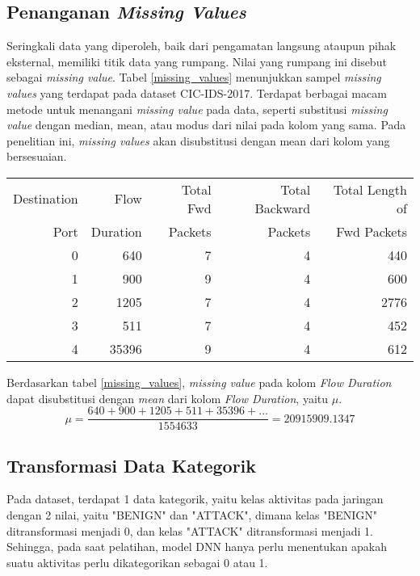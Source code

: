 \documentclass[a4paper,12pt]{report}
\begin{document}
\subsection{Penanganan \textit{Missing Values}}
Seringkali data yang diperoleh, baik dari pengamatan langsung ataupun pihak eksternal, memiliki titik data yang rumpang. Nilai yang rumpang ini disebut sebagai \textit{missing value}. Tabel \ref{missing_values} menunjukkan sampel \textit{missing values} yang terdapat pada dataset CIC-IDS-2017. Terdapat berbagai macam metode untuk menangani \textit{missing value} pada data, seperti substitusi \textit{missing value} dengan median, mean, atau modus dari nilai pada kolom yang sama. Pada penelitian ini, \textit{missing values} akan disubstitusi dengan mean dari kolom yang bersesuaian.
\begin{table}[h!]
	\centering
	\caption{Sampel data aktivitas jaringan}
	\label{sampel_data}
	\begin{longtable}{|r|r|r|r|r|}
		\hline
		Destination & Flow & Total Fwd & Total Backward & Total Length of  \\
		Port & Duration & Packets & Packets & Fwd Packets \\
		\hline
		0 & 640 & 7 & 4 & 440  \\
		\hline
		1 & 900 & 9 & 4 & 600  \\
		\hline
		2 & 1205 & 7 & 4 & 2776 \\
		\hline
		3 & 511 & 7 & 4 & 452 \\
		\hline
		4 & 35396 & 9 & 4 & 612 \\
		\hline
	\end{longtable}
\end{table}
Berdasarkan tabel \ref{missing_values}, \textit{missing value} pada kolom \textit{Flow Duration} dapat disubstitusi dengan \textit{mean} dari kolom \textit{Flow Duration}, yaitu $\mu$.
\begin{equation}
	\mu = \frac{640 + 900 + 1205 + 511 + 35396 + ... }{1554633} = 20915909.1347
	\label{mean_flow}
\end{equation}

\subsection{Transformasi Data Kategorik}
Pada dataset, terdapat 1 data kategorik, yaitu kelas aktivitas pada jaringan dengan 2 nilai, yaitu "BENIGN" dan "ATTACK", dimana kelas "BENIGN" ditransformasi menjadi 0, dan kelas "ATTACK" ditransformasi menjadi 1. Sehingga, pada saat pelatihan, model DNN hanya perlu menentukan apakah suatu aktivitas perlu dikategorikan sebagai 0 atau 1.
\end{document}
